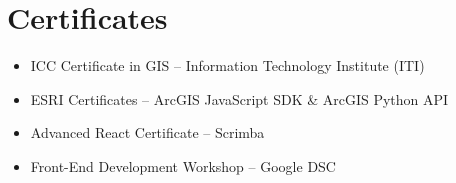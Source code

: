 \documentclass[letterpaper,10pt]{article}
\newcommand{\resumeItem}[1]{\item\small{#1}}
\newcommand{\resumeSubHeadingListStart}{\begin{itemize}[leftmargin=*]}
\newcommand{\resumeSubHeadingListEnd}{\end{itemize}}
\begin{document}
\section{Certificates}
\resumeSubHeadingListStart
  \resumeItem{ICC Certificate in GIS – Information Technology Institute (ITI)}
  \resumeItem{ESRI Certificates – ArcGIS JavaScript SDK \& ArcGIS Python API}
  \resumeItem{Advanced React Certificate – Scrimba}
  \resumeItem{Front-End Development Workshop – Google DSC}
\resumeSubHeadingListEnd
\end{document}

